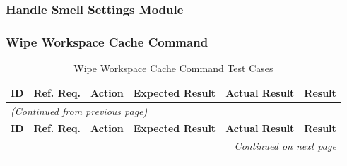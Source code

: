 \documentclass[12pt, titlepage]{article}
\begin{document}
\subsubsection{Handle Smell Settings Module}


\subsubsection{Wipe Workspace Cache Command}

\begin{longtable}{c 
  >{\raggedright\arraybackslash}p{1.5cm} 
  >{\raggedright\arraybackslash}p{4.5cm} 
  >{\raggedright\arraybackslash}p{4cm} 
  >{\raggedright\arraybackslash}p{3cm} c}
  \toprule
  \textbf{ID} & \textbf{Ref. Req.} & \textbf{Action} & \textbf{Expected Result} & \textbf{Actual Result} & \textbf{Result} \\ 
  \midrule
  \endfirsthead

  \multicolumn{6}{l}{\textit{(Continued from previous page)}} \\ 
  \toprule
  \textbf{ID} & \textbf{Ref. Req.} & \textbf{Action} & \textbf{Expected Result} & \textbf{Actual Result} & \textbf{Result} \\ 
  \midrule
  \endhead

  \multicolumn{6}{r}{\textit{Continued on next page}} \\
  \endfoot

  \bottomrule
  \caption{Wipe Workspace Cache Command Test Cases}
  \label{table:plugin_wipe_cache_tests}
  \endlastfoot


\end{longtable}
\end{document}
